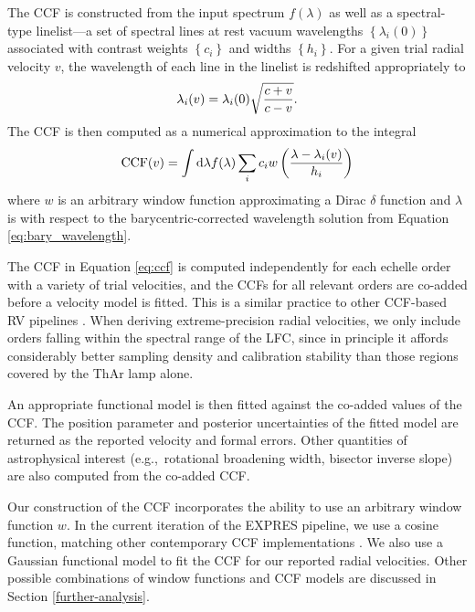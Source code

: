 The CCF is constructed from the input spectrum \(f(\lambda)\) as well as a spectral-type linelist---a set of spectral lines at rest vacuum wavelengths \(\left\{\lambda_i(0)\right\}\) associated with contrast weights \(\left\{c_i\right\}\) and widths \(\left\{h_i\right\}\). For a given trial radial velocity \(v\), the wavelength of each line in the linelist is redshifted appropriately to
\begin{equation}
    \lambda_i(v) = \lambda_i(0) \sqrt{c + v \over c - v}.
\end{equation}
The CCF is then computed as a numerical approximation to the integral
\begin{equation}
    \mathrm{CCF}(v) = \int \mathrm{d} \lambda f(\lambda) \sum_i c_i w\left(\lambda - \lambda_i(v) \over h_i\right)
    \label{eq:ccf}
\end{equation}
where \(w\) is an arbitrary window function approximating a Dirac \(\delta\) function and \(\lambda\) is with respect to the barycentric-corrected wavelength solution from Equation \ref{eq:bary_wavelength}.

The CCF in Equation \ref{eq:ccf} is computed independently for each echelle order with a variety of trial velocities, and the CCFs for all relevant orders are co-added before a velocity model is fitted. This is a similar practice to other CCF-based RV pipelines \citep[e.g.~][]{brahm_ceres_2017}. When deriving extreme-precision radial velocities, we only include orders falling within the spectral range of the LFC, since in principle it affords considerably better sampling density and calibration stability than those regions covered by the ThAr lamp alone.

An appropriate functional model is then fitted against the co-added values of the CCF. The position parameter and posterior uncertainties of the fitted model are returned as the reported velocity and formal errors. Other quantities of astrophysical interest (e.g.,~rotational broadening width, bisector inverse slope) are also computed from the co-added CCF.

Our construction of the CCF incorporates the ability to use an arbitrary window function \(w\). In the current iteration of the EXPRES pipeline, we use a cosine function, matching other contemporary CCF implementations \citep[e.g.~][]{freudling_automated_2013, brahm_ceres_2017, modigliani_espresso_2019}. We also use a Gaussian functional model to fit the CCF for our reported radial velocities. Other possible combinations of window functions and CCF models are discussed in Section \ref{further-analysis}.


